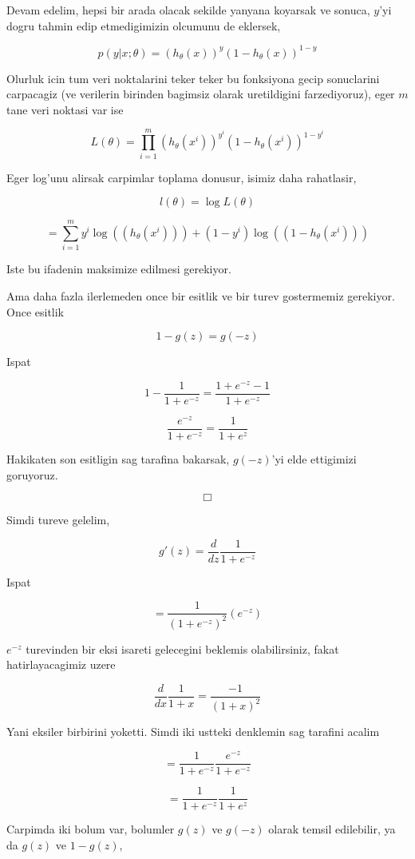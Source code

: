\documentclass[12pt,fleqn]{article}\usepackage{../common}
\begin{document}
Devam edelim, hepsi bir arada olacak sekilde yanyana koyarsak ve
sonuca, $y$'yi dogru tahmin edip etmedigimizin olcumunu de eklersek,

$$p(y | x;\theta) = (h_\theta(x))^y (1-h_\theta(x))^{1-y}$$

Olurluk icin tum veri noktalarini teker teker bu fonksiyona gecip
sonuclarini carpacagiz (ve verilerin birinden bagimsiz olarak
uretildigini farzediyoruz), eger $m$ tane veri noktasi var ise

$$ L(\theta) = \prod_{i=1}^{m} (h_\theta(x^i))^{y^i}
(1-h_\theta(x^i))^{1-{y^i}}$$

Eger log'unu alirsak carpimlar toplama donusur, isimiz daha rahatlasir,

$$ l(\theta) = \log L(\theta) $$

$$ = \sum_{i=1}^{m}
     y^i \log( (h_\theta(x^i)) ) +
     (1-{y^i}) \log( (1-h_\theta(x^i)) )
$$

Iste bu ifadenin maksimize edilmesi gerekiyor.

Ama daha fazla ilerlemeden once bir esitlik ve bir turev gostermemiz
gerekiyor.  Once esitlik

$$ 1-g(z) = g(-z) $$

Ispat

$$ 1-\frac{1}{1+e^{-z}}  = \frac{1+e^{-z}-1}{1+e^{-z}}$$

$$ \frac{e^{-z}}{1+e^{-z}} = \frac{1}{1+e^{z}}$$

Hakikaten son esitligin sag tarafina bakarsak, $g(-z)$'yi elde ettigimizi
goruyoruz.

$$ \Box $$

Simdi tureve gelelim,

$$
g'(z) = \frac{d}{dz} \frac{ 1}{1+ e^{ -z}} 
$$

Ispat

$$
= \frac{1}{(1+ e^{-z})^2} (e^{-z}) 
$$

$e^{ -z}$ turevinden bir eksi isareti gelecegini beklemis olabilirsiniz,
fakat hatirlayacagimiz uzere 

$$\frac{d}{dx} \frac{ 1}{1+x}  = \frac{-1}{(1+x)^2}$$

Yani eksiler birbirini yoketti. Simdi iki ustteki denklemin sag tarafini
acalim

$$
 = \frac{1}{1+e^{-z}} \frac{e^{-z}}{1+e^{-z}}
$$

$$
 = \frac{1}{1+e^{-z}} \frac{1}{1+e^{z}}
 $$

Carpimda iki bolum var, bolumler $g(z)$ ve $g(-z)$ olarak temsil
edilebilir, ya da  $g(z)$ ve $1-g(z)$, 
\end{document}

